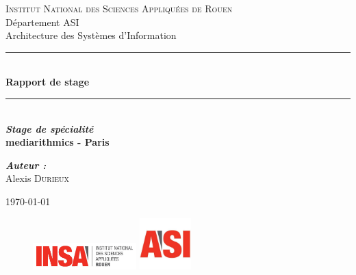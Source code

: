 \begin{titlepage}
    \newcommand{\HRule}{\rule{\linewidth}{0.5mm}} 
    \center 
    \textsc{\huge Institut National des Sciences Appliquées de Rouen}\\[0.7cm] 
    \LARGE Département ASI~\\[0.5cm]
    \Large{Architecture des Systèmes d'Information} ~\\[1.5cm]
    
    \HRule \\[0.4cm]
    { \huge \bfseries Rapport de stage}\\[0.2cm] \HRule \\[1.5cm]
     
    \LARGE \emph{\textbf{Stage de spécialité}} \\
    \textbf{mediarithmics - Paris}\\[2cm]
    
    \large
    \begin{minipage}[c]{.3\linewidth}
        \begin{center}
           \emph{\textbf{Auteur :}}\\
            Alexis \textsc{Durieux}\\
        \end{center}
       \end{minipage} \hfill
    
    \vfill{\today} 
    
    \begin{figure}
    \includegraphics[width=4cm]{images/insa.jpg}\hfill
    \includegraphics[width=2cm]{images/asi.jpeg}
    \end{figure}
    
    
     \end{titlepage}
    